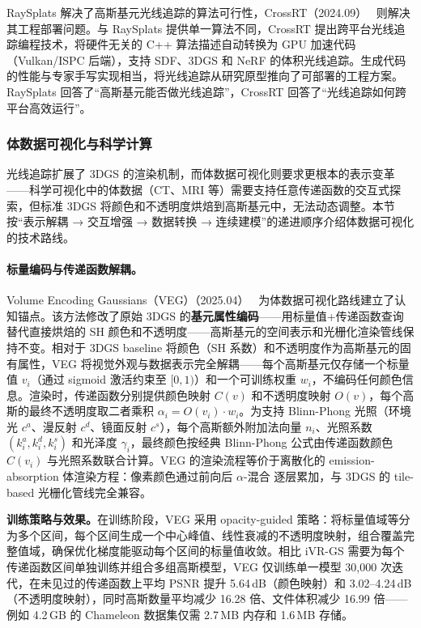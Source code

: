 RaySplats 解决了高斯基元光线追踪的算法可行性，CrossRT（2024.09）~\cite{2409_12617} 则解决其工程部署问题。与 RaySplats 提供单一算法不同，CrossRT 提出跨平台光线追踪编程技术，将硬件无关的 C++ 算法描述自动转换为 GPU 加速代码（Vulkan/ISPC 后端），支持 SDF、3DGS 和 NeRF 的体积光线追踪。生成代码的性能与专家手写实现相当，将光线追踪从研究原型推向了可部署的工程方案。RaySplats 回答了“高斯基元能否做光线追踪”，CrossRT 回答了“光线追踪如何跨平台高效运行”。

\subsubsection{体数据可视化与科学计算}

光线追踪扩展了 3DGS 的渲染机制，而体数据可视化则要求更根本的表示变革——科学可视化中的体数据（CT、MRI 等）需要支持任意传递函数的交互式探索，但标准 3DGS 将颜色和不透明度烘焙到高斯基元中，无法动态调整。本节按“表示解耦 → 交互增强 → 数据转换 → 连续建模”的递进顺序介绍体数据可视化的技术路线。

\paragraph{标量编码与传递函数解耦。}

Volume Encoding Gaussians（VEG）（2025.04）~\cite{2504_13339} 为体数据可视化路线建立了认知锚点。该方法修改了原始 3DGS 的\textbf{基元属性编码}——用标量值+传递函数查询替代直接烘焙的 SH 颜色和不透明度——高斯基元的空间表示和光栅化渲染管线保持不变。相对于 3DGS baseline 将颜色（SH 系数）和不透明度作为高斯基元的固有属性，VEG 将视觉外观与数据表示完全解耦——每个高斯基元仅存储一个标量值 $v_i$（通过 sigmoid 激活约束至 $[0,1)$）和一个可训练权重 $w_i$，不编码任何颜色信息。渲染时，传递函数分别提供颜色映射 $C(v)$ 和不透明度映射 $O(v)$，每个高斯的最终不透明度取二者乘积 $\alpha_i = O(v_i) \cdot w_i$。为支持 Blinn-Phong 光照（环境光 $c^a$、漫反射 $c^d$、镜面反射 $c^s$），每个高斯额外附加法向量 $n_i$、光照系数 $(k^a_i, k^d_i, k^s_i)$ 和光泽度 $\gamma_i$，最终颜色按经典 Blinn-Phong 公式由传递函数颜色 $C(v_i)$ 与光照系数联合计算。VEG 的渲染流程等价于离散化的 emission-absorption 体渲染方程：像素颜色通过前向后 $\alpha$-混合 逐层累加，与 3DGS 的 tile-based 光栅化管线完全兼容。

\textbf{训练策略与效果。}在训练阶段，VEG 采用 opacity-guided 策略：将标量值域等分为多个区间，每个区间生成一个中心峰值、线性衰减的不透明度映射，组合覆盖完整值域，确保优化梯度能驱动每个区间的标量值收敛。相比 iVR-GS 需要为每个传递函数区间单独训练并组合多组高斯模型，VEG 仅训练单一模型 30,000 次迭代，在未见过的传递函数上平均 PSNR 提升 5.64\,dB（颜色映射）和 3.02--4.24\,dB（不透明度映射），同时高斯数量平均减少 16.28 倍、文件体积减少 16.99 倍——例如 4.2\,GB 的 Chameleon 数据集仅需 2.7\,MB 内存和 1.6\,MB 存储。

